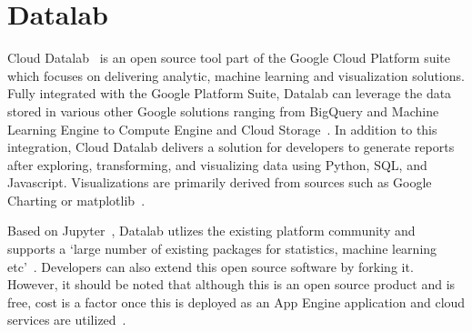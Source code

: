 \section{Datalab}

Cloud Datalab~\cite{hid-sp18-504-google-datalab} is an open source tool 
part of the Google Cloud Platform suite which focuses on delivering
analytic, machine learning and visualization solutions. Fully integrated
with the Google Platform Suite, Datalab can leverage the data stored in
various other Google solutions ranging from BigQuery and Machine Learning
Engine to Compute Engine and Cloud Storage~\cite{hid-sp18-504-google-datalab}.
In addition to this integration, Cloud Datalab delivers a solution for
developers to generate reports after exploring, transforming, and visualizing
data using Python, SQL, and Javascript. Visualizations are primarily
derived from sources such as Google Charting or matplotlib~\cite{hid-sp18-504-techcrunch-datalab}.

Based on Jupyter~\cite{hid-sp18-504-google-datalab}, Datalab utlizes the
existing platform community and supports a `large number of existing packages
for statistics, machine learning etc'~\cite{hid-sp18-504-google-datalab}.
Developers can also extend this open source software by forking it.
However, it should be noted that although this is an open source product
and is free, cost is a factor once this is deployed as an
App Engine application and cloud services are utilized~\cite{hid-sp18-504-techcrunch-datalab}.
